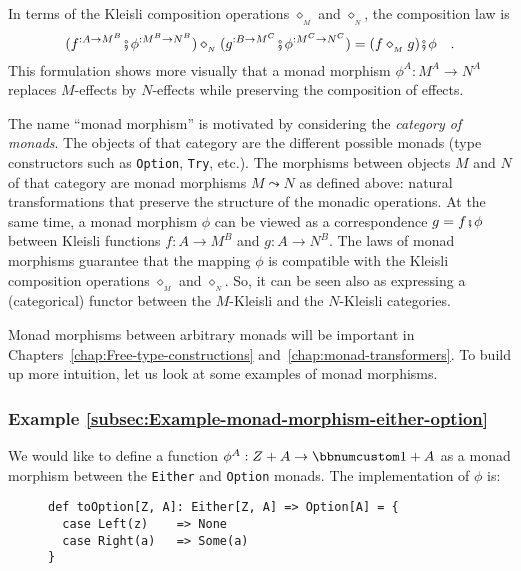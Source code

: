 In terms of the Kleisli composition operations $\diamond_{_{M}}$
and $\diamond_{_{N}}$, the composition law is
\[
(f^{:A\rightarrow M^{B}}\bef\phi^{:M^{B}\rightarrow N^{B}})\diamond_{_{N}}(g^{:B\rightarrow M^{C}}\bef\phi^{:M^{C}\rightarrow N^{C}})=(f\diamond_{_{M}}g)\bef\phi\quad.
\]
This formulation shows more visually that a monad morphism $\phi^{A}:M^{A}\rightarrow N^{A}$
replaces $M$-effects by $N$-effects while preserving the composition
of effects.

The name \textsf{``}monad morphism\textsf{''} is motivated by considering the \emph{category
of monads}. The objects of that category are the different possible
monads (type constructors such as \lstinline!Option!, \lstinline!Try!,
etc.). The morphisms between objects $M$ and $N$ of that category
are monad morphisms $M\leadsto N$ as defined above: natural transformations
that preserve the structure of the monadic operations. At the same
time, a monad morphism $\phi$ can be viewed as a correspondence $g=f\bef\phi$
between Kleisli functions $f:A\rightarrow M^{B}$ and $g:A\rightarrow N^{B}$.
The laws of monad morphisms guarantee that the mapping $\phi$ is
compatible with the Kleisli composition operations $\diamond_{_{M}}$
and $\diamond_{_{N}}$. So, it can be seen also as expressing a (categorical)
functor between the $M$-Kleisli and the $N$-Kleisli categories.

Monad morphisms between arbitrary monads will be important in Chapters~\ref{chap:Free-type-constructions}
and~\ref{chap:monad-transformers}. To build up more intuition, let
us look at some examples of monad morphisms.

\subsubsection{Example \label{subsec:Example-monad-morphism-either-option}\ref{subsec:Example-monad-morphism-either-option}}

We would like to define a function $\phi^{A}:Z+A\rightarrow\bbnum 1+A$
as a monad morphism between the \lstinline!Either! and \lstinline!Option!
monads. The implementation of $\phi$ is:

\begin{wrapfigure}{l}{0.5\columnwidth}%
\vspace{-0.75\baselineskip}

\begin{lstlisting}
def toOption[Z, A]: Either[Z, A] => Option[A] = {
  case Left(z)    => None
  case Right(a)   => Some(a)
}
\end{lstlisting}
\vspace{-1.7\baselineskip}
\end{wrapfigure}%

